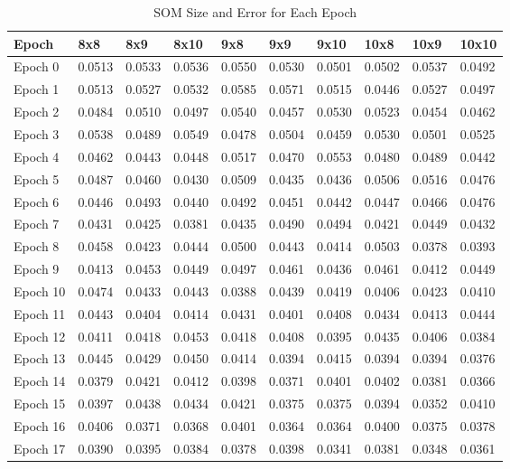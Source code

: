\begin{table}[htbp]
\centering
\caption{SOM Size and Error for Each Epoch}
\begin{tabular}{|l|l|l|l|l|l|l|l|l|l|}
\hline
Epoch & 8x8 & 8x9 & 8x10 & 9x8 & 9x9 & 9x10 & 10x8 & 10x9 & 10x10 \\
\hline
Epoch 0 & 0.0513 & 0.0533 & 0.0536 & 0.0550 & 0.0530 & 0.0501 & 0.0502 & 0.0537 & 0.0492  \\
Epoch 1 & 0.0513 & 0.0527 & 0.0532 & 0.0585 & 0.0571 & 0.0515 & 0.0446 & 0.0527 & 0.0497  \\
Epoch 2 & 0.0484 & 0.0510 & 0.0497 & 0.0540 & 0.0457 & 0.0530 & 0.0523 & 0.0454 & 0.0462  \\
Epoch 3 & 0.0538 & 0.0489 & 0.0549 & 0.0478 & 0.0504 & 0.0459 & 0.0530 & 0.0501 & 0.0525  \\
Epoch 4 & 0.0462 & 0.0443 & 0.0448 & 0.0517 & 0.0470 & 0.0553 & 0.0480 & 0.0489 & 0.0442  \\
Epoch 5 & 0.0487 & 0.0460 & 0.0430 & 0.0509 & 0.0435 & 0.0436 & 0.0506 & 0.0516 & 0.0476  \\
Epoch 6 & 0.0446 & 0.0493 & 0.0440 & 0.0492 & 0.0451 & 0.0442 & 0.0447 & 0.0466 & 0.0476  \\
Epoch 7 & 0.0431 & 0.0425 & 0.0381 & 0.0435 & 0.0490 & 0.0494 & 0.0421 & 0.0449 & 0.0432  \\
Epoch 8 & 0.0458 & 0.0423 & 0.0444 & 0.0500 & 0.0443 & 0.0414 & 0.0503 & 0.0378 & 0.0393  \\
Epoch 9 & 0.0413 & 0.0453 & 0.0449 & 0.0497 & 0.0461 & 0.0436 & 0.0461 & 0.0412 & 0.0449  \\
Epoch 10 & 0.0474 & 0.0433 & 0.0443 & 0.0388 & 0.0439 & 0.0419 & 0.0406 & 0.0423 & 0.0410  \\
Epoch 11 & 0.0443 & 0.0404 & 0.0414 & 0.0431 & 0.0401 & 0.0408 & 0.0434 & 0.0413 & 0.0444  \\
Epoch 12 & 0.0411 & 0.0418 & 0.0453 & 0.0418 & 0.0408 & 0.0395 & 0.0435 & 0.0406 & 0.0384  \\
Epoch 13 & 0.0445 & 0.0429 & 0.0450 & 0.0414 & 0.0394 & 0.0415 & 0.0394 & 0.0394 & 0.0376  \\
Epoch 14 & 0.0379 & 0.0421 & 0.0412 & 0.0398 & 0.0371 & 0.0401 & 0.0402 & 0.0381 & 0.0366  \\
Epoch 15 & 0.0397 & 0.0438 & 0.0434 & 0.0421 & 0.0375 & 0.0375 & 0.0394 & 0.0352 & 0.0410  \\
Epoch 16 & 0.0406 & 0.0371 & 0.0368 & 0.0401 & 0.0364 & 0.0364 & 0.0400 & 0.0375 & 0.0378  \\
Epoch 17 & 0.0390 & 0.0395 & 0.0384 & 0.0378 & 0.0398 & 0.0341 & 0.0381 & 0.0348 & 0.0361  \\

\end{tabular}
\end{table}
